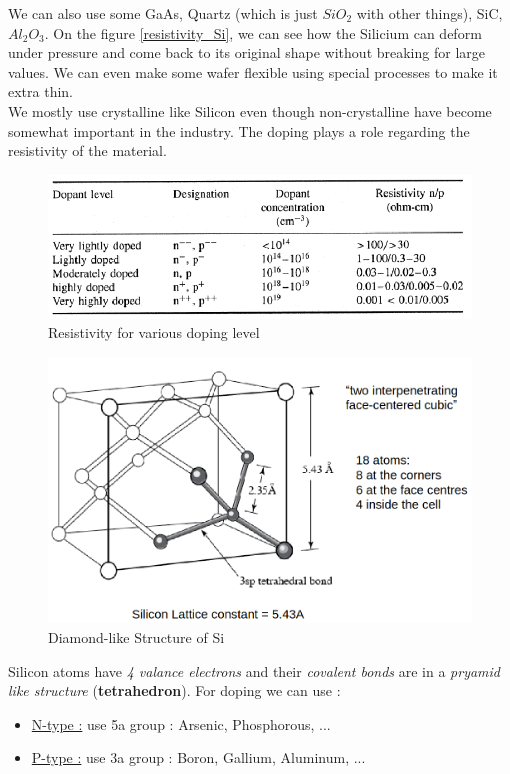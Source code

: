 \documentclass{report}
\begin{document}
We can also use some GaAs, Quartz (which is just $SiO_2$ with other things), SiC, $Al_2O_3$. On the figure \ref{resistivity_Si}, we can see how the Silicium can deform under pressure and come back to its original shape without breaking for large values. We can even make some wafer flexible using special processes to make it extra thin.\\

We mostly use crystalline like Silicon even though non-crystalline have become somewhat important in the industry. The doping plays a role regarding the resistivity of the material.

\begin{figure}[H]
    \centering
    \includegraphics[width=0.75\linewidth]{resistivity_Ohm_Si.png}
    \caption{Resistivity for various doping level}
    \label{fig:resistivity-Si-Ohms}
\end{figure}


\newpage
\begin{figure}
    \centering
    \includegraphics[width=0.95\linewidth]{crystal_si.png}
    \caption{Diamond-like Structure of Si}
    \label{fig:diamond-structure}
\end{figure}

Silicon atoms have \textit{4 valance electrons} and their \textit{covalent bonds} are in a \textit{pryamid like structure} (\textbf{tetrahedron}). For doping we can use : 
\begin{itemize}
    \item \underline{N-type :} use 5a group : Arsenic, Phosphorous, ...
    \item \underline{P-type :} use 3a group : Boron, Gallium, Aluminum, ...
\end{itemize}
\end{document}
